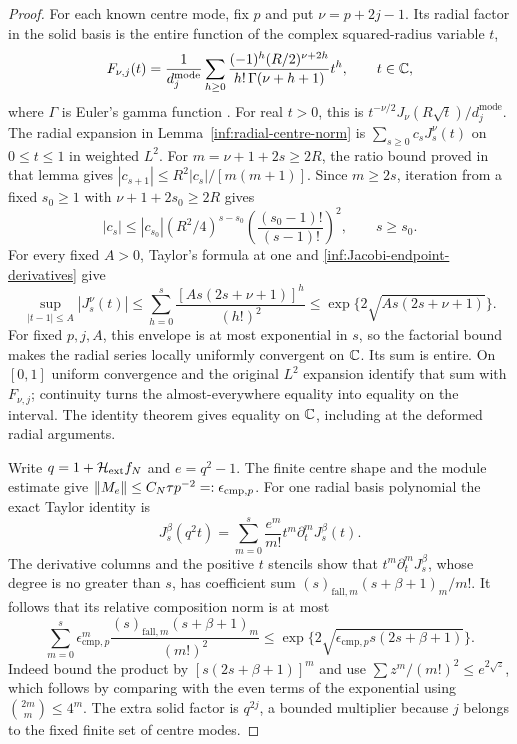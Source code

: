\begin{proof}
For each known centre mode, fix $p$ and put $\nu=p+2j-1$.
Its radial factor in the solid basis is the entire function of
the complex squared-radius variable $t$,
\[
 F_{\nu,j}(t)=\frac1{d_j^{\mathrm{mode}}}
 \sum_{h\ge0}\frac{(-1)^h(R/2)^{\nu+2h}}{h!\,\Gamma(\nu+h+1)}t^h,
 \qquad t\in\mathbb{C},
\]
where $\Gamma$ is Euler's gamma function
\cite[Eq.~10.2.2]{inf:dlmf}. For real $t>0$, this is
$t^{-\nu/2}J_\nu(R\sqrt t)/d_j^{\mathrm{mode}}$.
The radial expansion in Lemma~\ref{inf:radial-centre-norm} is
$\sum_{s\ge0}c_sJ_s^\nu(t)$ on $0\le t\le1$ in weighted $L^2$.
For $m=\nu+1+2s\ge2R$, the ratio bound proved in that lemma gives
$|c_{s+1}|\le R^2|c_s|/[m(m+1)]$. Since $m\ge2s$, iteration
from a fixed $s_0\ge1$ with $\nu+1+2s_0\ge2R$ gives
\[
 |c_s|\le |c_{s_0}|(R^2/4)^{s-s_0}
                 \left(\frac{(s_0-1)!}{(s-1)!}\right)^2,
 \qquad s\ge s_0.
\]
For every fixed $A>0$, Taylor's formula at one and
\eqref{inf:Jacobi-endpoint-derivatives} give
\[
 \sup_{|t-1|\le A}|J_s^\nu(t)|
 \le\sum_{h=0}^s\frac{[A s(2s+\nu+1)]^h}{(h!)^2}
 \le\exp\{2\sqrt{A s(2s+\nu+1)}\}.
\]
For fixed $p,j,A$, this envelope is at most exponential in $s$,
so the factorial bound makes the radial series locally uniformly
convergent on $\mathbb{C}$. Its sum is entire. On $[0,1]$ uniform
convergence and the original $L^2$ expansion identify that sum
with $F_{\nu,j}$; continuity turns the almost-everywhere equality
into equality on the interval. The identity theorem gives
equality on $\mathbb{C}$, including at the deformed radial arguments.

Write $q=1+\mathcal H_{\mathrm{ext}} f_N$ and $e=q^2-1$.
The finite centre shape and the module estimate give
$\lVert M_e\rVert\le C_N\tau p^{-2}=:\epsilon_{\mathrm{cmp},p}$.
For one radial basis polynomial the exact Taylor identity is
\[
 J_s^\beta(q^2t)=\sum_{m=0}^s\frac{e^m}{m!}
                                      t^m\partial_t^mJ_s^\beta(t).
\]
The derivative columns and the positive $t$ stencils show that
$t^m\partial_t^mJ_s^\beta$, whose degree is no greater than $s$,
has coefficient sum
$(s)_{\mathrm{fall},m}(s+\beta+1)_m/m!$.
It follows that its relative composition norm is at most
\begin{equation}\label{inf:composition-bound}
 \sum_{m=0}^s\epsilon_{\mathrm{cmp},p}^m
 \frac{(s)_{\mathrm{fall},m}(s+\beta+1)_m}{(m!)^2}
 \le\exp\{2\sqrt{\epsilon_{\mathrm{cmp},p}s(2s+\beta+1)}\}.
\end{equation}
Indeed bound the product by $[s(2s+\beta+1)]^m$ and use
$\sum z^m/(m!)^2\le e^{2\sqrt z}$, which follows by comparing
with the even terms of the exponential using
$\binom{2m}m\le4^m$.
The extra solid factor is $q^{2j}$, a bounded multiplier because
$j$ belongs to the fixed finite set of centre modes.


\end{proof}
